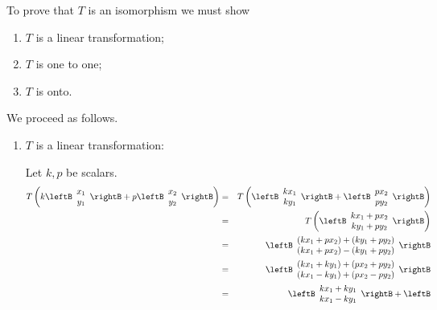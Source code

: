 \begin{solution}
To prove that $T$ is an isomorphism we must show
\begin{enumerate}
\item $T$ is a linear transformation;
\item $T$ is one to one;
\item $T$ is onto.
\end{enumerate}

We proceed as follows.

\begin{enumerate}
\item $T$ is a linear transformation:

Let $k, p$ be scalars. 
\begin{eqnarray*}
T \left( k \leftB \begin{array}{c}
x_1 \\
y_1
\end{array} \rightB + p \leftB \begin{array}{c}
x_2 \\
y_2
\end{array} \rightB \right) &=& 
T \left(  \leftB \begin{array}{c}
kx_1 \\
ky_1
\end{array} \rightB + \leftB \begin{array}{c}
px_2 \\
py_2
\end{array} \rightB \right) \\
&=&
T \left(  \leftB \begin{array}{c}
kx_1 + px_2 \\
ky_1 + py_2
\end{array} \rightB  \right) \\
&=& 
\leftB \begin{array}{c}
(kx_1 + px_2) + (ky_1 + py_2) \\
(kx_1 + px_2) - (ky_1 + py_2)
\end{array} \rightB \\
&=& 
\leftB \begin{array}{c}
(kx_1 + ky_1) + (px_2 + py_2) \\
(kx_1  - ky_1) + (px_2 - py_2)
\end{array} \rightB \\
&=&
\leftB \begin{array}{c}
kx_1 + ky_1  \\
kx_1  - ky_1
\end{array} \rightB + 
\leftB \begin{array}{c}

\end{array}
\end{eqnarray*}
\end{enumerate}
\end{solution}
